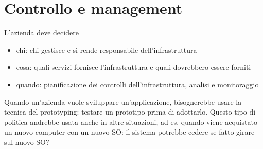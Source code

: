 \section{Controllo e management}
\label{sec:Controllo e management}
L'azienda deve decidere
\begin{itemize}
  \item chi: chi gestisce e si rende responsabile dell'infrastruttura
  \item cosa: quali servizi fornisce l'infrastruttura e quali dovrebbero essere forniti
  \item quando: pianificazione dei controlli dell'infrastruttura, analisi e monitoraggio
\end{itemize}
Quando un'azienda vuole sviluppare un'applicazione, bisognerebbe usare la tecnica del prototyping:
testare un prototipo prima di adottarlo.
Questo tipo di politica andrebbe usata anche in altre situazioni, ad es. quando viene acquistato un
nuovo computer con un nuovo SO: il sistema potrebbe cedere se fatto girare sul nuovo SO?
